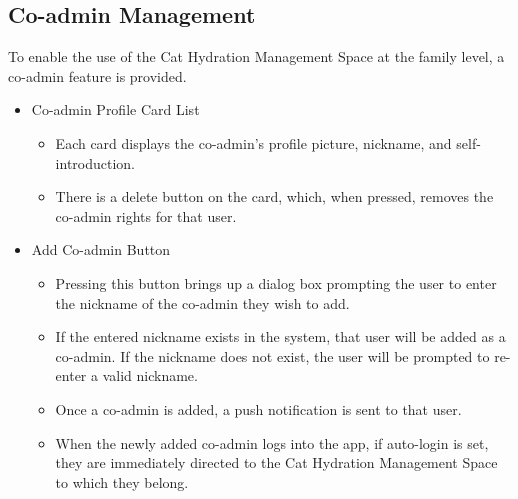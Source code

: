\documentclass[conference]{IEEEtran}
\begin{document}
\subsection{Co-admin Management}
To enable the use of the Cat Hydration Management Space at the family level, a co-admin feature is provided.\newline
\begin{itemize}
\item Co-admin Profile Card List
    \begin{itemize}
        \item Each card displays the co-admin's profile picture, nickname, and self-introduction.
        \item There is a delete button on the card, which, when pressed, removes the co-admin rights for that user.
    \end{itemize}
\item Add Co-admin Button
    \begin{itemize}
        \item Pressing this button brings up a dialog box prompting the user to enter the nickname of the co-admin they wish to add.
        \item If the entered nickname exists in the system, that user will be added as a co-admin. If the nickname does not exist, the user will be prompted to re-enter a valid nickname.
        \item Once a co-admin is added, a push notification is sent to that user.
        \item When the newly added co-admin logs into the app, if auto-login is set, they are immediately directed to the Cat Hydration Management Space to which they belong.\\
    \end{itemize}
\end{itemize}

\newpage
\end{document}
